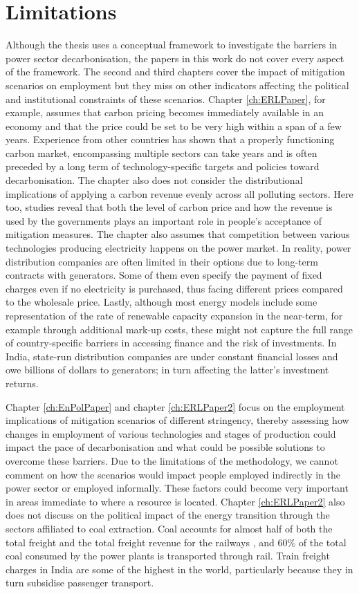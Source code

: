 \documentclass[../thesis.tex]{subfiles}
\begin{document}
\section{Limitations}
Although the thesis uses a conceptual framework to investigate the barriers in power sector decarbonisation, the papers in this work do not cover every aspect of the framework. The second and third chapters cover the impact of mitigation scenarios on employment but they miss on other indicators affecting the political and institutional constraints of these scenarios. Chapter \ref{ch:ERLPaper}, for example, assumes that carbon pricing becomes immediately available in an economy and that the price could be set to be very high within a span of a few years. Experience from other countries has shown that a properly functioning carbon market, encompassing multiple sectors can take years and is often preceded by a long term of technology-specific targets and policies toward decarbonisation. The chapter also does not consider the distributional implications of applying a carbon revenue evenly across all polluting sectors. Here too, studies reveal that both the level of carbon price and how the revenue is used by the governments plays an important role in people's acceptance of mitigation measures. The chapter also assumes that competition between various technologies producing electricity happens on the power market. In reality, power distribution companies are often limited in their options due to long-term contracts with generators. Some of them even specify the payment of fixed charges even if no electricity is purchased, thus facing different prices compared to the wholesale price. Lastly, although most energy models include some representation of the rate of renewable capacity expansion in the near-term, for example through additional mark-up costs, these might not capture the full range of country-specific barriers in accessing finance and the risk of investments. In India, state-run distribution companies are under constant financial losses and owe billions of dollars to generators; in turn affecting the latter's investment returns. 

Chapter \ref{ch:EnPolPaper} and chapter \ref{ch:ERLPaper2} focus on the employment implications of mitigation scenarios of different stringency, thereby assessing how changes in employment of various technologies and stages of production could impact the pace of decarbonisation and what could be possible solutions to overcome these barriers. Due to the limitations of the methodology, we cannot comment on how the scenarios would impact people employed indirectly in the power sector or employed informally. These factors could become very important in areas immediate to where a resource is located. Chapter \ref{ch:ERLPaper2} also does not discuss on the political impact of the energy transition through the sectors affiliated to coal extraction. Coal accounts for almost half of both the total freight and the total freight revenue for the railways \citep{kamboj2018,iea2021}, and 60\% of the total coal consumed by the power plants is transported through rail. Train freight charges in India are some of the highest in the world, particularly because they in turn subsidise passenger transport. 
\end{document}
